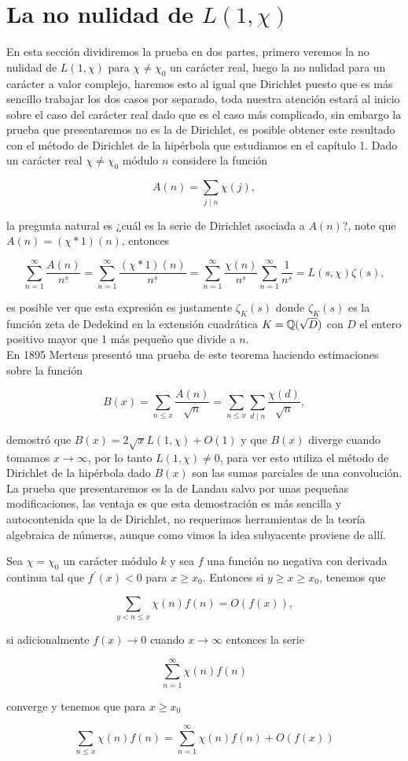 \section{La no nulidad de \texorpdfstring{$L(1,\chi)$}{Lg}}

En esta sección dividiremos la prueba en dos partes, primero veremos la no nulidad de $L(1,\chi)$ para $\chi\neq\chi_0$ un carácter real, luego la no nulidad para un carácter a valor complejo, haremos esto al igual que Dirichlet puesto que es más sencillo trabajar los dos casos por separado, toda nuestra atención estará al inicio sobre el caso del carácter real dado que es el caso más complicado, sin embargo la prueba que presentaremos no es la de Dirichlet, es posible obtener este resultado con el método de Dirichlet de la hipérbola que estudiamos en el capítulo 1. Dado un carácter real $\chi\neq\chi_0$ módulo $n$ considere la función

$$A(n)=\sum_{j\mid n}\chi(j),$$

la  pregunta natural es ¿cuál es la serie de Dirichlet asociada a $A(n)$?, note que $A(n)=(\chi*1)(n)$, entonces

$$\sum_{n=1}^{\infty} \frac{A(n)}{n^s}=\sum_{n=1}^{\infty} \frac{(\chi*1)(n)}{n^s}=\sum_{n=1}^{\infty} \frac{\chi(n)}{n^s}\sum_{n=1}^{\infty} \frac{1}{n^s}=L(s,\chi)\zeta(s),$$

es posible ver que esta expresión es justamente $\zeta_K(s)$ donde $\zeta_K(s)$ es la función zeta de Dedekind en la extensión cuadrática $K=\mathbb{Q}(\sqrt{D})$ con $D$ el entero positivo mayor que 1 más pequeño que divide a $n$.\\

En 1895 Mertens presentó una prueba de este teorema haciendo estimaciones sobre la función 

$$B(x)=\sum_{n\leq x}\frac{A(n)}{\sqrt{n}}=\sum_{n\leq x}\sum_{d\mid n}\frac{\chi(d)}{\sqrt{n} },$$

demostró que $B(x)=2 \sqrt{x}L(1,\chi)+O(1)$ y que $B(x)$ diverge cuando tomamos $x\to\infty$, por lo tanto $L(1,\chi)\neq 0$, para ver esto utiliza el método de Dirichlet de la hipérbola dado $B(x)$ son las sumas parciales de una convolución. La prueba que presentaremos es la de Landau salvo por unas pequeñas modificaciones, las ventaja es que esta demostración es más sencilla y autocontenida que la de Dirichlet, no requerimos herramientas de la teoría algebraica de números, aunque como vimos la idea subyacente proviene de allí.

\begin{theorem}
Sea $\chi=\chi_0$ un carácter módulo $k$ y sea $f$ una función no negativa con derivada continua tal que $f^{\prime}(x)<0$ para $x\geq x_0$. Entonces si $y\geq x\geq x_0$, tenemos que

$$\sum_{y<n\leq x}\chi(n)f(n)=O(f(x)),$$

si adicionalmente $f(x)\to 0$ cuando $x\to \infty$ entonces la serie

$$\sum_{n=1}^{\infty} \chi(n)f(n)$$

converge y tenemos que para $x\geq x_0$

$$\sum_{n\leq x}\chi(n)f(n)=\sum_{n=1}^{\infty} \chi(n)f(n)+O(f(x))$$
\end{theorem}

